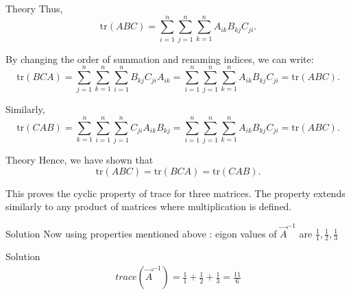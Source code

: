 \documentclass{beamer}
\begin{document}
\begin{frame}{Theory}
Thus,
\[
\mathrm{tr}(ABC) = \sum_{i=1}^n \sum_{j=1}^n \sum_{k=1}^n A_{ik} B_{kj} C_{ji}.
\]

\bigskip

By changing the order of summation and renaming indices, we can write:
\[
\mathrm{tr}(BCA) = \sum_{j=1}^n \sum_{k=1}^n \sum_{i=1}^n B_{kj} C_{ji} A_{ik} = \sum_{i=1}^n \sum_{j=1}^n \sum_{k=1}^n A_{ik} B_{kj} C_{ji} = \mathrm{tr}(ABC).
\]

Similarly,
\[
\mathrm{tr}(CAB) = \sum_{k=1}^n \sum_{i=1}^n \sum_{j=1}^n C_{ji} A_{ik} B_{kj} = \sum_{i=1}^n \sum_{j=1}^n \sum_{k=1}^n A_{ik} B_{kj} C_{ji} = \mathrm{tr}(ABC).
\]

\bigskip
\end{frame}
\begin{frame}{Theory}
Hence, we have shown that
\[
\mathrm{tr}(ABC) = \mathrm{tr}(BCA) = \mathrm{tr}(CAB).
\]

This proves the cyclic property of trace for three matrices. The property extends similarly to any product of matrices where multiplication is defined.



\end{frame}

\begin{frame}{Solution}
    Now using properties mentioned above :
    eigon values of $\Vec{A}^{-1}$ are $\frac{1}{1},\frac{1}{2},\frac{1}{3}$
    
\end{frame}    
\begin{frame}{Solution}
   \begin{align}
       trace(\Vec{A}^{-1})= \frac{1}{1}+\frac{1}{2}+\frac{1}{3}=\frac{11}{6}
   \end{align} 
\end{frame}
\end{document}

